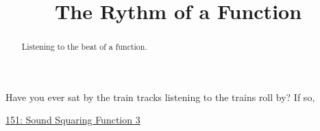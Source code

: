 \documentclass{ximera}
\title{The Rythm of a Function}
\begin{document}
\begin{abstract}
Listening to the beat of a function.
\end{abstract}
\maketitle

Have you ever sat by the train tracks listening to the trains roll by? If so, 


\begin{onlineOnly}
    \begin{center}
\end{center}
\end{onlineOnly}

\href{https://www.desmos.com/calculator/kbmmg1u1nw}{151: Sound Squaring Function 3}
\end{document}
